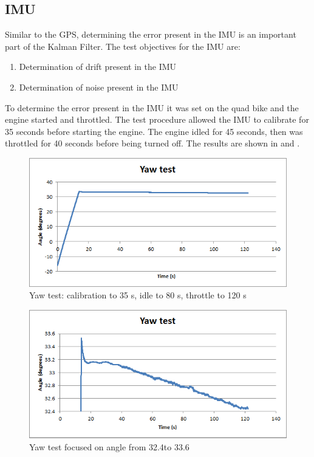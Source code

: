 \documentclass[main.tex]{subfiles}
\begin{document}
\subsection{IMU}
Similar to the GPS, determining the error present in the IMU is an important part of the Kalman Filter. The test objectives for the IMU are:
\begin{enumerate}
\item Determination of drift present in the IMU
\item Determination of noise present in the IMU
\end{enumerate}
To determine the error present in the IMU it was set on the quad bike and the engine started and throttled. The test procedure allowed the IMU to calibrate for 35 seconds before starting the engine. The engine idled for 45 seconds, then was throttled for 40 seconds before being turned off. The results are shown in  and .
\begin{figure}[ht]
\includegraphics[width=1\textwidth]{5-Testing/yawTest.png}
\centering
\caption{Yaw test: calibration to 35 s, idle to 80 s, throttle to 120 s}
\end{figure}
\begin{figure}[ht]
\includegraphics[width=1\textwidth]{5-Testing/yawTestZoomed.png}
\centering
\caption{Yaw test focused on angle from 32.4\degree to 33.6\degree}
\end{figure}
\end{document}
